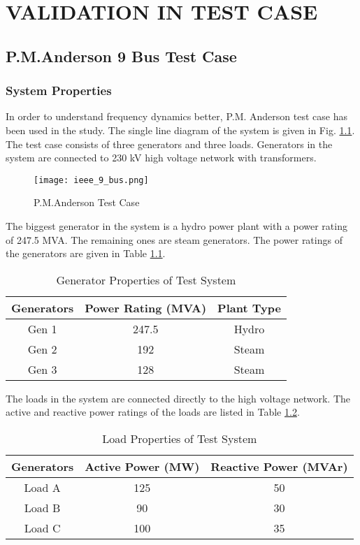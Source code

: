 \chapter{VALIDATION IN TEST CASE}
\label{chp:5}
\section{P.M.Anderson 9 Bus Test Case}
\subsection{System Properties}
In order to understand frequency dynamics better, P.M. Anderson test case has been used in the study. The single line diagram of the system is given in Fig. \ref{ieee_9_bus}. The test case consists of three generators and three loads. Generators in the system are connected to 230 kV high voltage network with transformers.\par
\begin{figure}[h!]
	\centering
	\texttt{[image: ieee\_9\_bus.png]}
	\caption{P.M.Anderson Test Case}
	\label{ieee_9_bus}
\end{figure}
The biggest generator in the system is a hydro power plant with a power rating of 247.5 MVA. The remaining ones are steam generators. The power ratings of the generators are given in Table \ref{generatorproperties}.\par
\begin{table}[h!]
	\centering
	\begin{tabular}{ccc}
		\hline
		\textbf{Generators} & \textbf{Power Rating (MVA)} & \textbf{Plant Type} \\ \hline
		Gen 1               & 247.5                       & Hydro				\\
		Gen 2               & 192                         & Steam               \\
		Gen 3               & 128                         & Steam               \\ \hline
	\end{tabular}
	\caption{Generator Properties of Test System}
	\label{generatorproperties}
\end{table}
The loads in the system are connected directly to the high voltage network. The active and reactive power ratings of the loads are listed in Table \ref{loadproperties}.
\begin{table}[h!]
	\centering
	\begin{tabular}{ccc}
		\hline
		\textbf{Generators} & \textbf{Active Power (MW)}  & \textbf{Reactive Power (MVAr)} \\ \hline
		Load A              & 125                      	  & 50				 \\
		Load B              & 90                          & 30                \\
		Load C              & 100                         & 35                \\ \hline
	\end{tabular}
	\caption{Load Properties of Test System}
	\label{loadproperties}
\end{table}
